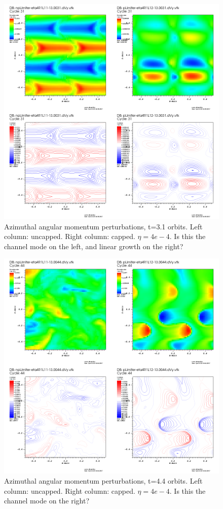 \begin{figure}[h]
  \begin{center}  
    \includegraphics[width=.9\textwidth, angle=0.]{img/eta4_slice_dVy_t31.png}
  \end{center}
  \caption{Azimuthal angular momentum perturbations, t=3.1 orbits. Left column: uncapped. Right column: capped. $\eta=4e-4$. Is this the channel mode on the left, and linear growth on the right?}
  \label{fig:t31}
\end{figure}
\begin{figure}[h]
  \begin{center}  
    \includegraphics[width=.9\textwidth, angle=0.]{img/eta4_slice_dVy_t44.png}
  \end{center}
  \caption{Azimuthal angular momentum perturbations, t=4.4 orbits. Left column: uncapped. Right column: capped. $\eta=4e-4$. Is this the channel mode on the right?}
  \label{fig:t44}
\end{figure}

